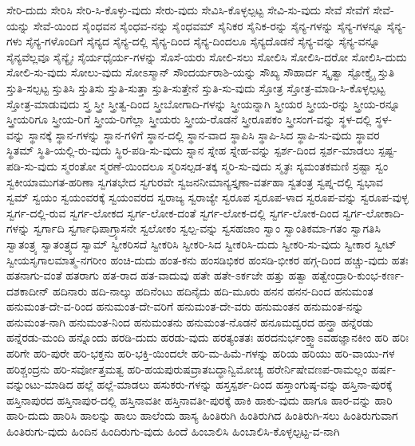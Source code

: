 {ಸೇರಿ-ದುದು
ಸೇರಿಸಿ
ಸೇರಿ-ಸಿ-ಕೊಳ್ಳು-ವುದು
ಸೇರು-ವುದು
ಸೇವಿಸಿ-ಕೊಳ್ಳಲ್ಪಟ್ಟ
ಸೇವಿ-ಸು-ವುದು
ಸೇವೆ
ಸೇವೆಗೆ
ಸೇವೆ-ಯನ್ನು
ಸೇವೆ-ಯಿಂದ
ಸೈಂಧವನ
ಸೈಂಧವ-ನನ್ನು
ಸೈಂಧವಮ್
ಸೈನಿಕರ
ಸೈನಿಕ-ರನ್ನು
ಸೈನ್ಯ-ಗಳನ್ನು
ಸೈನ್ಯ-ಗಳನ್ನೂ
ಸೈನ್ಯ-ಗಳು
ಸೈನ್ಯ-ಗಳೊಂದಿಗೆ
ಸೈನ್ಯದ
ಸೈನ್ಯ-ದಲ್ಲಿ
ಸೈನ್ಯ-ದಿಂದ
ಸೈನ್ಯ-ದಿಂದಲೂ
ಸೈನ್ಯದೊಡನೆ
ಸೈನ್ಯ-ವನ್ನು
ಸೈನ್ಯ-ವನ್ನೂ
ಸೈನ್ಯವೆಲ್ಲವೂ
ಸೈನ್ಯೈಃ
ಸೈರ್ಯಧೈರ್ಯ-ಗಳನ್ನು
ಸೊಸೆ-ಯರು
ಸೋಲಿ-ಸಲು
ಸೋಲಿಸಿ
ಸೋಲಿಸಿ-ದರೋ
ಸೋಲಿಸಿ-ದುದು
ಸೋಲಿ-ಸು-ವುದು
ಸೋಲು-ವುದು
ಸೋಽಸ್ಮಾನ್
ಸೌಂದರ್ಯರಾಶಿ-ಯನ್ನು
ಸೌಖ್ಯ
ಸೌಹಾರ್ದ
ಸ್ಕೃತ್ವಾ
ಸ್ಟೋಕ್ತ್ಯೈ
ಸ್ತುತಿ
ಸ್ತುತಿ-ಸಲ್ಪಟ್ಟ
ಸ್ತುತಿಸಿ
ಸ್ತುತಿಸು
ಸ್ತುತಿ-ಸುತ್ತಾ
ಸ್ತುತಿ-ಸುತ್ತೇನೆ
ಸ್ತುತಿ-ಸು-ವುದು
ಸ್ತೋತ್ರ
ಸ್ತೋತ್ರ-ಮಾಡಿ-ಸಿ-ಕೊಳ್ಳಲ್ಪಟ್ಟ
ಸ್ತೋತ್ರ-ಮಾಡುವುದು
ಸ್ತ್ರ
ಸ್ತ್ರೀ
ಸ್ತ್ರೀತ್ವ-ದಿಂದ
ಸ್ತ್ರೀಬೋಗಾದಿ-ಗಳನ್ನು
ಸ್ತ್ರೀಯನ್ನಾಗಿ
ಸ್ತ್ರೀಯರ
ಸ್ತ್ರೀಯ-ರನ್ನು
ಸ್ತ್ರೀಯ-ರನ್ನೂ
ಸ್ತ್ರೀಯರಿಗೂ
ಸ್ತ್ರೀಯ-ರಿಗೆ
ಸ್ತ್ರೀಯ-ರಿಗೆಲ್ಲಾ
ಸ್ತ್ರೀಯರು
ಸ್ತ್ರೀಯ-ರೊಡನೆ
ಸ್ತ್ರೀರೂಪಕಂ
ಸ್ತ್ರೀಸಂಗ-ವನ್ನು
ಸ್ಥಳ-ದಲ್ಲಿ
ಸ್ಥಳ-ವನ್ನು
ಸ್ಥಾನಕ್ಕೆ
ಸ್ಥಾನ-ಗಳನ್ನು
ಸ್ಥಾನ-ಗಳಿಗೆ
ಸ್ಥಾನ-ದಲ್ಲಿ
ಸ್ಥಾನ-ವಾದ
ಸ್ಥಾಪಿಸಿ
ಸ್ಥಾಪಿ-ಸಿದ
ಸ್ಥಾಪಿ-ಸು-ವುದು
ಸ್ಥಾವರ
ಸ್ಥಿತಮ್
ಸ್ಥಿತಿ-ಯಲ್ಲಿ-ರು-ವುದು
ಸ್ಥಿರ-ಪಡಿ-ಸು-ವುದು
ಸ್ನಾನ
ಸ್ನೇಹ
ಸ್ನೇಹ-ವನ್ನು
ಸ್ಪರ್ಶ-ದಿಂದ
ಸ್ಪರ್ಶ-ಮಾಡಲು
ಸ್ಪಷ್ಟ-ಪಡಿ-ಸು-ವುದು
ಸ್ಮರಂತೋ
ಸ್ಮರಣೆ-ಯಿಂದಲೂ
ಸ್ಮರಿಸಲ್ಪಡ-ತಕ್ಕ
ಸ್ಮರಿ-ಸು-ವುದು
ಸ್ಮೃತಃ
ಸ್ಯಮಂತಕಮಣಿ
ಸ್ರಷ್ಟಾ
ಸ್ವಂ
ಸ್ವಕೀಯಾಮುಗತ-ಹರಿಣಾ
ಸ್ವಗತಭೇದ
ಸ್ವಗುರವೇ
ಸ್ವಜನನೀಮಾನ್ಯಸ್ತೃಣಾ-ವರ್ತಹಾ
ಸ್ವತಂತ್ರ
ಸ್ವಪ್ನ-ದಲ್ಲಿ
ಸ್ವಭಾವ
ಸ್ವಮ್
ಸ್ವಯಂ
ಸ್ವಯಂವರಕ್ಕೆ
ಸ್ವಯಂವರದ
ಸ್ವರಾಜ್ಯ
ಸ್ವರಾಜ್ಯೇ
ಸ್ವರೂಪ
ಸ್ವರೂಪ-ಳಾದ
ಸ್ವರೂಪ-ವನ್ನು
ಸ್ವರೂಪ-ವುಳ್ಳ
ಸ್ವರ್ಗ-ದಲ್ಲಿ-ರುವ
ಸ್ವರ್ಗ-ಲೋಕದ
ಸ್ವರ್ಗ-ಲೋಕ-ದಂತೆ
ಸ್ವರ್ಗ-ಲೋಕ-ದಲ್ಲಿ
ಸ್ವರ್ಗ-ಲೋಕ-ದಿಂದ
ಸ್ವರ್ಗ-ಲೋಕಾದಿ-ಗಳನ್ನು
ಸ್ವರ್ಗಾದಿ
ಸ್ವರ್ಗಾಧಿಪಾಗ್ರ್ಯಾಸನೇ
ಸ್ವಲೋಕಂ
ಸ್ವಲ್ಪ-ವನ್ನು
ಸ್ವಸಹಜಾಂ
ಸ್ವಾಂ
ಸ್ವಾಂತಿಕಮಾ-ಗತಂ
ಸ್ವಾಗತಿಸಿ
ಸ್ವಾತಂತ್ರ್ಯ
ಸ್ವಾತಂತ್ರ್ಯದ
ಸ್ವಾಮ್
ಸ್ವೀಕರಿಸದೆ
ಸ್ವೀಕರಿಸಿ
ಸ್ವೀಕರಿ-ಸಿದ
ಸ್ವೀಕರಿಸಿ-ದುದು
ಸ್ವೀಕರಿ-ಸು-ವುದು
ಸ್ವೀಕಾರ
ಸ್ವೀಟ್
ಸ್ವೀಯಸೃಗಾಲಮಾತ್ಮ-ನಗರೀಂ
ಹಂಚಿ-ದುದು
ಹಂತ-ಕನು
ಹಂಸಡಿಭಿಕರ
ಹಂಸಡಿ-ಭೀಕರ
ಹಗ್ಗ-ದಿಂದ
ಹಚ್ಚು-ವುದು
ಹತಃ
ಹತನಾಗು-ವಂತೆ
ಹತರಾಗು
ಹತ-ರಾದ
ಹತ-ವಾದುವು
ಹತೇ
ಹತೇ-ಽರ್ಕಜೇ
ಹತ್ತು
ಹತ್ವಾ
ಹತ್ವೇಂದ್ರಾರಿ-ಕುಂಭ-ಕರ್ಣ-ದಶಕಾದೀನ್
ಹದಿನಾರು
ಹದಿ-ನಾಲ್ಕು
ಹದಿನೆಂಟು
ಹದಿನೈದು
ಹದಿ-ಮೂರು
ಹನನ
ಹನನ-ದಿಂದ
ಹನುಮಂತ
ಹನುಮಂತ-ದೇ-ವ-ರಿಂದ
ಹನುಮಂತ-ದೇ-ವರಿಗೆ
ಹನುಮಂತ-ದೇ-ವರು
ಹನುಮಂತನ
ಹನುಮಂತ-ನನ್ನು
ಹನುಮಂತ-ನಾಗಿ
ಹನುಮಂತ-ನಿಂದ
ಹನುಮಂತನು
ಹನುಮಂತ-ನೊಡನೆ
ಹನೂಮದ್ವರದ
ಹನ್ತ್ರಾ
ಹನ್ನೆರಡು
ಹನ್ನೆರಡು-ಮಂದಿ
ಹನ್ನೊಂದು
ಹರಡಿ-ದುದು
ಹರಡು-ವುದು
ಹರತ್ಯಂತತಃ
ಹರದನುರ್ಭಂಕ್ತ್ವಾಽವಹಜ್ಞಾನಕೀಂ
ಹರಿ
ಹರಿಃ
ಹರಿಗೇ
ಹರಿ-ಪುರೇ
ಹರಿ-ಭಕ್ತನು
ಹರಿ-ಭಕ್ತಿ-ಯಿಂದಲೇ
ಹರಿ-ಮ-ಹಿಮೆ-ಗಳನ್ನು
ಹರಿಯ
ಹರಿಯು
ಹರಿ-ವಾಯು-ಗಳ
ಹರಿಶ್ಚಂದ್ರನು
ಹರಿ-ಸರ್ವೋತ್ತಮತ್ವ
ಹರಿ-ಹಯಪುರುಷವ್ರಾತಬದ್ಧಾನ್ವಿಮೋಚ್ಯ
ಹರೇರ್ನಿಷೇವಣಪ-ರಾಮಲ್ಲಂ
ಹರ್ಷ-ವನ್ನುಂಟು-ಮಾಡಿದ
ಹಲ್ಲೆ
ಹಲ್ಲೆ-ಮಾಡಲು
ಹಸುಕರು-ಗಳನ್ನು
ಹಸ್ತಸ್ಪರ್ಶ-ದಿಂದ
ಹಸ್ತಾಂಗುಷ್ಠ-ವನ್ನು
ಹಸ್ತಿನಾ-ಪುರಕ್ಕೆ
ಹಸ್ತಿನಾಪುರದ
ಹಸ್ತಿನಾಪುರ-ದಲ್ಲಿ
ಹಸ್ತಿನಾವತೀ
ಹಸ್ತಿನಾವತೀ-ಪುರಕ್ಕೆ
ಹಾಕಿ
ಹಾಕು-ವುದು
ಹಾಗೂ
ಹಾರ-ವನ್ನು
ಹಾರಿ
ಹಾರಿ-ದುದು
ಹಾರಿಸಿ
ಹಾಲನ್ನು
ಹಾಲು
ಹಾಲೆಂದು
ಹಾಸ್ಯ
ಹಿಂತಿರುಗಿ
ಹಿಂತಿರುಗಿದ
ಹಿಂತಿರುಗಿ-ಸಲು
ಹಿಂತಿರುಗುವಾಗ
ಹಿಂತಿರುಗು-ವುದು
ಹಿಂದಿನ
ಹಿಂದಿರುಗು-ವುದು
ಹಿಂದೆ
ಹಿಂಬಾಲಿಸಿ
ಹಿಂಬಾಲಿಸಿ-ಕೊಳ್ಳಲ್ಪಟ್ಟ-ವ-ನಾಗಿ
}
